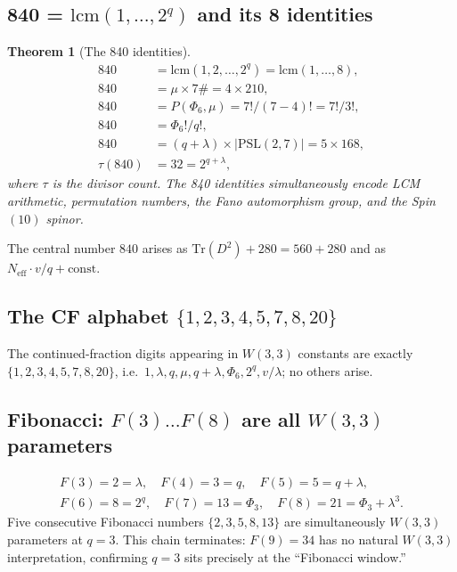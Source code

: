 \documentclass[12pt,a4paper]{article}
\newtheorem{theorem}{Theorem}[section]
\theoremstyle{definition}
\renewcommand{\Tr}{\mathrm{Tr}}
\newcommand{\Phithree}{\Phi_3}
\newcommand{\Phisix}{\Phi_6}
\newcommand{\Neff}{N_{\mathrm{eff}}}
\newcommand{\PSL}{\mathrm{PSL}}
\begin{document}
\subsection{840 = \texorpdfstring{$\mathrm{lcm}(1,\ldots,2^q)$}{lcm(1,...,8)} and its 8 identities}

\begin{theorem}[The 840 identities]
\label{thm:840}
\begin{align}
  840 &= \mathrm{lcm}(1,2,\ldots,2^q) = \mathrm{lcm}(1,\ldots,8), \\
  840 &= \mu\times 7\# = 4\times 210, \\
  840 &= P(\Phisix,\mu) = 7!/(7-4)! = 7!/3!, \\
  840 &= \Phisix!/q!, \\
  840 &= (q+\lambda)\times|\PSL(2,7)| = 5\times 168, \\
  \tau(840) &= 32 = 2^{q+\lambda},
\end{align}
where $\tau$ is the divisor count.  The 840 identities simultaneously
encode LCM arithmetic, permutation numbers, the Fano automorphism
group, and the Spin$(10)$ spinor.
\end{theorem}

The central number $840$ arises as $\Tr(D^2)+280 = 560+280$ and as
$\Neff\cdot v/q+\mathrm{const}$.

\subsection{The CF alphabet \texorpdfstring{$\{1,2,3,4,5,7,8,20\}$}{}}

The continued-fraction digits appearing in $W(3,3)$
constants are exactly
$\{1,\allowbreak 2,\allowbreak 3,\allowbreak 4,\allowbreak 5,\allowbreak 7,\allowbreak 8,\allowbreak 20\}$,
i.e.~$1,\lambda,q,\mu,q{+}\lambda,\Phisix,2^q,v/\lambda$;
no others arise.

\subsection{Fibonacci: \texorpdfstring{$F(3)\ldots F(8)$}{F(3)...F(8)} are all \texorpdfstring{$W(3,3)$}{W(3,3)} parameters}

\begin{gather}
  \label{eq:fibonacci}
  F(3)=2=\lambda,\quad
  F(4)=3=q,\quad
  F(5)=5=q+\lambda,\nonumber\\
  F(6)=8=2^q,\quad
  F(7)=13=\Phithree,\quad
  F(8)=21=\Phithree+\lambda^3.
\end{gather}
Five consecutive Fibonacci numbers $\{2,3,5,8,13\}$ are simultaneously
$W(3,3)$ parameters at $q=3$.  This chain terminates: $F(9)=34$ has no
natural $W(3,3)$ interpretation, confirming $q=3$ sits precisely at
the ``Fibonacci window.''
\end{document}
